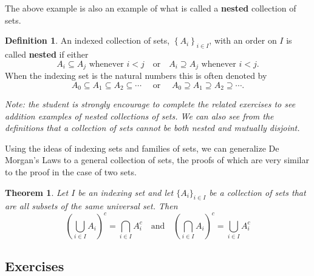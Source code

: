 \documentclass[
]{book}
\newtheorem{theorem}{Theorem}[chapter]
\theoremstyle{definition}
\newtheorem{definition}{Definition}[chapter]
\theoremstyle{definition}
\theoremstyle{definition}
\theoremstyle{definition}
\theoremstyle{remark}
\begin{document}
The above example is also an example of what is called a \textbf{nested} collection of sets.

\begin{definition}
\protect\hypertarget{def:nested}{}\label{def:nested}An indexed collection of sets, \(\left\{ A_i\right\}_{i\in I}\), with an order on \(I\) is called \textbf{nested} if either
\[A_i \subseteq A_j \mbox{ whenever } i<j \quad \mbox{or} \quad A_i \supseteq A_j \mbox{ whenever } i<j.\]
When the indexing set is the natural numbers this is often denoted by \[A_0 \subseteq A_1 \subseteq A_2 \subseteq \cdots \quad \mbox{ or } \quad A_0 \supseteq A_1 \supseteq A_2 \supseteq \cdots.\]
\end{definition}

\emph{Note: the student is strongly encourage to complete the related exercises to see addition examples of nested collections of sets. We can also see from the definitions that a collection of sets cannot be both nested and mutually disjoint.}

Using the ideas of indexing sets and families of sets, we can generalize De Morgan's Laws to a general collection of sets, the proofs of which are very similar to the proof in the case of two sets.

\begin{theorem}
\protect\hypertarget{thm:Generalized-De-Morgans-Laws}{}\label{thm:Generalized-De-Morgans-Laws}Let \(I\) be an indexing set and let \(\{A_i\}_{i\in I}\) be a collection of sets that are all subsets of the same universal set. Then
\[\left( \bigcup_{i\in I} A_i \right)^c = \bigcap_{i \in I} A_i^c \quad \mbox{and} \quad \left( \bigcap_{i\in I} A_i \right)^c = \bigcup_{i \in I} A_i^c\]
\end{theorem}

\hypertarget{exercises-5}{%
\subsection{Exercises}\label{exercises-5}}
\end{document}
